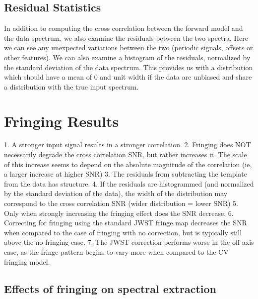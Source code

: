 \subsection{Residual Statistics}
In addition to computing the cross correlation between the forward model and the data spectrum, we also examine the residuals between the two spectra.
Here we can see any unexpected variations between the two (periodic signals, offsets or other features).
We can also examine a histogram of the residuals, normalized by the standard deviation of the data spectrum.
This provides us with a  distribution which should have a mean of 0 and unit width if the data are unbiased and share a distribution with the true input spectrum.
\section{Fringing Results}
1. A stronger input signal results in a stronger correlation.
2. Fringing does NOT necessarily degrade the cross correlation SNR, but rather increases it. The scale of this increase seems to depend on the absolute magnitude of the correlation (ie, a larger increase at higher SNR)
3. The residuals from subtracting the template from the data has structure.
4. If the residuals are histogrammed (and normalized by the standard deviation of the data), the width of the distribution may correspond to the cross correlation SNR (wider distribution = lower SNR)
5. Only when strongly increasing the fringing effect does the SNR decrease.
6. Correcting for fringing using the standard JWST fringe map decreases the SNR when compared to the case of fringing with no correction, but is typically still above the no-fringing case.
7. The JWST correction performs worse in the off axis case, as the fringe pattern begins to vary more when compared to the CV fringing model.
\subsection{Effects of fringing on spectral extraction}